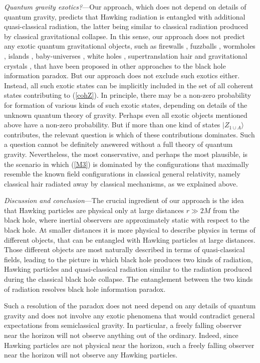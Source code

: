 \documentclass[aps,prd,onecolumn,groupedaddress,showkeys,12pt]{revtex4-2}
\begin{document}
{\it Quantum gravity exotics?}---Our approach, which does not depend on details of quantum gravity, 
predicts that Hawking radiation is entangled with additional quasi-classical radiation, the latter being similar
to classical radiation produced by classical gravitational collapse. In this sense, our approach does not predict 
any exotic quantum gravitational objects, such as firewalls \cite{AMPS}, fuzzballs \cite{mathur}, wormholes \cite{er=epr},
islands \cite{island}, baby-universes \cite{gid}, white holes \cite{rovelli_tunnel}, supertranslation hair \cite{softhair}
and gravitational crystals \cite{nik_cryst},
that have been proposed in other approaches to the black hole information paradox. 
But our approach does not exclude such exotics either. Instead, all such exotic states can be implicitly included 
in the set of all coherent states contributing to (\ref{cohZ}). In principle, there may be a non-zero probability 
for formation of various kinds of such exotic states, depending on details of the unknown quantum theory of gravity.
Perhaps even all exotic objects mentioned above have a non-zero probability. But if more than one kind of 
states $|Z_{1\cup A}\rangle$ contributes, the relevant question is which of these contributions dominates. 
Such a question cannot be definitely answered without a full theory of quantum gravity. Nevertheless,
the most conservative, and perhaps the most plausible, is the scenario in which (\ref{M3}) is dominated 
by the configurations that maximally resemble the known field configurations in classical general relativity, 
namely classical hair radiated away by classical mechanisms, as we explained above.

{\it Discussion and conclusion}---The crucial ingredient of our approach is the idea that Hawking particles are physical 
only at large distances $r\gg 2M$ from the black hole, where inertial observers are approximately static with respect 
to the black hole. At smaller distances it is more physical to describe physics in terms of different objects, 
that can be entangled with Hawking particles at large distances. Those different objects are most naturally described in terms 
of quasi-classical fields, leading to the picture in which black hole produces two kinds of radiation,
Hawking particles and quasi-classical radiation similar to the radiation produced during the classical black hole collapse.
The entanglement between the two kinds of radiation resolves black hole information paradox. 

Such a resolution of the paradox does not need depend on any details of quantum gravity and does not involve 
any exotic phenomena that would contradict general expectations from semiclassical gravity.
In particular, a freely falling observer near the horizon will not observe anything out of the ordinary.
Indeed, since Hawking particles are not physical near the horizon, such a freely falling observer near the horizon 
will not observe any Hawking particles.         
\end{document}
